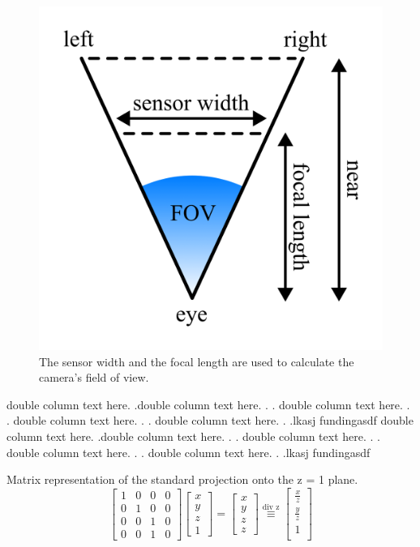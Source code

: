 \documentclass[conference]{IEEEtran}
\begin{document}
\begin{figure}
    \centering
    \includegraphics[width=0.45\columnwidth]{./images/focal_lenght_and_field_of_view.png}
    \caption{The sensor width and the focal length are used to calculate the camera's field of view.}
    \label{img:fov}
\end{figure}

double column text here. .double column text here. . .
double column text here. . .
double column text here. . .
double column text here. . .lkasj fundingasdf
double column text here. .double column text here. . .
double column text here. . .
double column text here. . .
double column text here. . .lkasj fundingasdf

Matrix representation of the standard projection onto the z = 1 plane.
\begin{equation}
    \begin{bmatrix}
        1 & 0 & 0 & 0 \\
        0 & 1 & 0 & 0 \\
        0 & 0 & 1 & 0 \\
        0 & 0 & 1 & 0
    \end{bmatrix}
    \begin{bmatrix}
        x \\
        y \\
        z \\
        1
    \end{bmatrix}
    =
    \begin{bmatrix}
        x \\
        y \\
        z \\
        z
    \end{bmatrix}
    \overset{\text{div z}}{\equiv}
    \begin{bmatrix}
        \frac{x}{z} \\
        \frac{y}{z} \\
        1           \\
    \end{bmatrix}
\end{equation}
\end{document}
